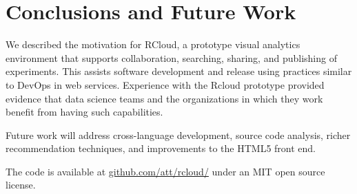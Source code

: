 \section{Conclusions and Future Work}

We described the motivation for RCloud, a prototype
visual analytics environment that supports collaboration,
searching, sharing, and publishing of experiments.
This assists software development and release using
practices similar to DevOps in web services.
Experience with the Rcloud prototype provided evidence that
data science teams and the organizations in which they work
benefit from having such capabilities.

Future work will address cross-language development,
source code analysis, richer recommendation techniques,
and improvements to the HTML5 front end.

The code is available 
at \url{github.com/att/rcloud/}
under an MIT open source license.
